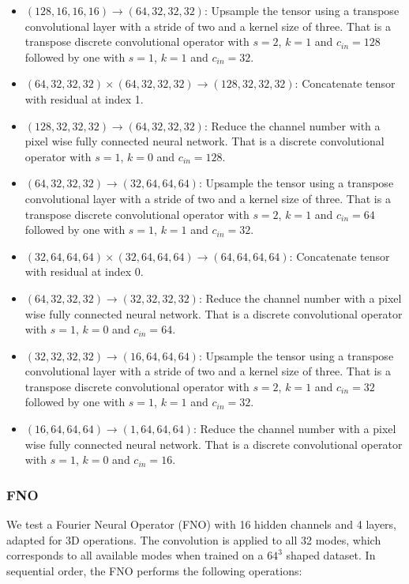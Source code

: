 \documentclass{article}
\begin{document}
\begin{itemize}
    \item $(128, 16, 16, 16) \rightarrow (64, 32, 32, 32)$: Upsample the tensor using a transpose convolutional layer with a stride of two and a kernel size of three. That is a transpose discrete convolutional operator with $s=2$, $k=1$ and $c_{in} = 128$ followed by one with $s=1$, $k=1$ and $c_{in} = 32$.
    \item $(64, 32, 32, 32) \times (64, 32, 32, 32) \rightarrow (128, 32, 32, 32)$: Concatenate tensor with residual at index 1.
    \item $(128, 32, 32, 32) \rightarrow (64, 32, 32, 32)$: Reduce the channel number with a pixel wise fully connected neural network. That is a discrete convolutional operator with $s=1$, $k=0$ and $c_{in}=128$.
    \item $(64, 32, 32, 32) \rightarrow (32, 64, 64, 64)$: Upsample the tensor using a transpose convolutional layer with a stride of two and a kernel size of three. That is a transpose discrete convolutional operator with $s=2$, $k=1$ and $c_{in} = 64$ followed by one with $s=1$, $k=1$ and $c_{in} = 32$.
    \item $(32, 64, 64, 64) \times (32, 64, 64, 64) \rightarrow (64, 64, 64, 64)$: Concatenate tensor with residual at index 0.
    \item $(64, 32, 32, 32) \rightarrow (32, 32, 32, 32)$: Reduce the channel number with a pixel wise fully connected neural network. That is a discrete convolutional operator with $s=1$, $k=0$ and $c_{in}=64$.
    \item $(32, 32, 32, 32) \rightarrow (16, 64, 64, 64)$: Upsample the tensor using a transpose convolutional layer with a stride of two and a kernel size of three. That is a transpose discrete convolutional operator with $s=2$, $k=1$ and $c_{in} = 32$ followed by one with $s=1$, $k=1$ and $c_{in} = 32$.
    \item $(16, 64, 64, 64) \rightarrow (1, 64, 64, 64)$: Reduce the channel number with a pixel wise fully connected neural network. That is a discrete convolutional operator with $s=1$, $k=0$ and $c_{in}=16$.
\end{itemize}


\subsubsection{FNO}

We test a Fourier Neural Operator (FNO) with 16 hidden channels and 4 layers, adapted for 3D operations. The convolution is applied to all 32 modes, which corresponds to all available modes when trained on a $64^3$ shaped dataset. In sequential order, the FNO performs the following operations:
\end{document}
